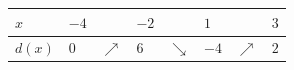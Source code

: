 \documentclass[border=.4pt]{standalone}
\begin{document}
\color{ink}\begin{tabular}{|>{\centering\arraybackslash}m{1.7cm}|>{\centering\arraybackslash}m{1.25cm}|>{\centering\arraybackslash}m{1.25cm}|>{\centering\arraybackslash}m{1.25cm}|>{\centering\arraybackslash}m{1.25cm}|>{\centering\arraybackslash}m{1.25cm}|>{\centering\arraybackslash}m{1.25cm}|>{\centering\arraybackslash}m{1.25cm}|}\hline
\cellcolor{head}$x$ & \cellcolor{head}$-4$ & \cellcolor{head} & \cellcolor{head}$-2$ & \cellcolor{head} & \cellcolor{head}$1$ & \cellcolor{head} & \cellcolor{head}$3$ \\ \hline
\cellcolor{head}$d(x)$ & $0$ & \color{focus}\large $\nearrow$ & $6$ & \color{focus}\large $\searrow$ & $-4$ & \color{focus}\large $\nearrow$ & $2$ \\ \hline\end{tabular}
\end{document}
